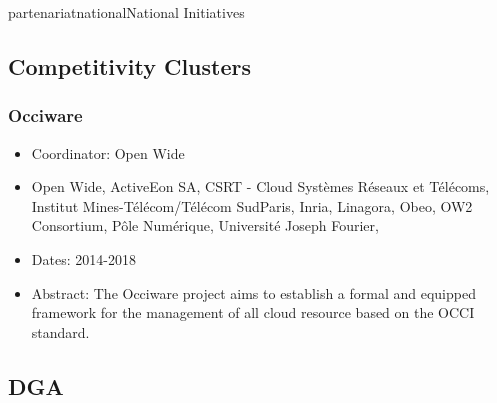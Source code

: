 \documentclass{ra2018}
\begin{document}
\begin{module}{partenariat}{national}{National Initiatives}
\subsection{Competitivity Clusters}

\subsubsection*{\label{project:occiware}Occiware}
\begin{itemize}
	\item Coordinator: Open Wide
	\item Open Wide, ActiveEon SA, CSRT - Cloud  Systèmes Réseaux et Télécoms, Institut Mines-Télécom/Télécom SudParis, Inria, Linagora, Obeo, OW2 Consortium, Pôle Numérique, Université Joseph Fourier, 
	\item Dates: 2014-2018
	\item Abstract: The Occiware project aims to establish a formal and equipped framework for the management of all cloud resource based on the OCCI standard. 
\end{itemize}




\subsection{DGA}






\end{module}
\end{document}
